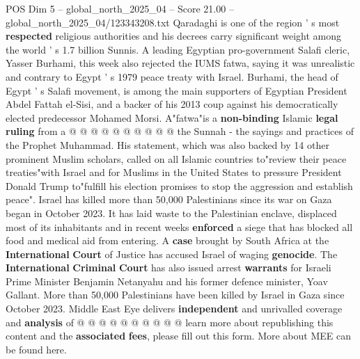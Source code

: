\begin{textsample}{POS Dim 5 – global\_north\_2025\_04 – Score 21.00 – global\_north\_2025\_04/123343208.txt}
Qaradaghi is one of the region ' s most \textbf{respected} religious authorities and his decrees carry significant weight among the world ' s 1.7 billion Sunnis.
A leading Egyptian pro-government Salafi cleric, Yasser Burhami, this week also rejected the IUMS fatwa, saying it was unrealistic and contrary to Egypt ' s 1979 peace treaty with Israel.
Burhami, the head of Egypt ' s Salafi movement, is among the main supporters of Egyptian President Abdel Fattah el-Sisi, and a backer of his 2013 coup against his democratically elected predecessor Mohamed Morsi.
A"fatwa"is a \textbf{non-binding} Islamic \textbf{legal} \textbf{ruling} from a @ @ @ @ @ @ @ @ @ @ the Sunnah - the sayings and practices of the Prophet Muhammad.
His statement, which was also backed by 14 other prominent Muslim scholars, called on all Islamic countries to"review their peace treaties"with Israel and for Muslims in the United States to pressure President Donald Trump to"fulfill his election promises to stop the aggression and establish peace".
Israel has killed more than 50,000 Palestinians since its war on Gaza began in October 2023.
It has laid waste to the Palestinian enclave, displaced most of its inhabitants and in recent weeks \textbf{enforced} a siege that has blocked all food and medical aid from entering.
A \textbf{case} brought by South Africa at the \textbf{International} \textbf{Court} of Justice has accused Israel of waging \textbf{genocide}.
The \textbf{International} \textbf{Criminal} \textbf{Court} has also issued arrest \textbf{warrants} for Israeli Prime Minister Benjamin Netanyahu and his former defence minister, Yoav Gallant.
More than 50,000 Palestinians have been killed by Israel in Gaza since October 2023.
Middle East Eye delivers \textbf{independent} and unrivalled coverage and \textbf{analysis} of @ @ @ @ @ @ @ @ @ @ learn more about republishing this content and the \textbf{associated} \textbf{fees}, please fill out this form.
More about MEE can be found here.

\end{textsample}
